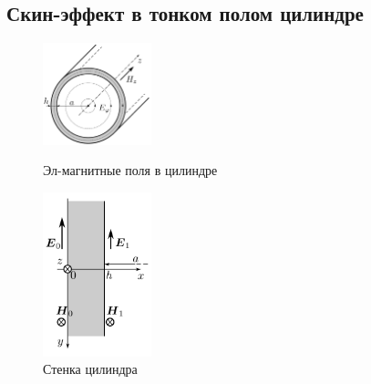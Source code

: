 \documentclass{article}
\begin{document}

\subsection{Скин-эффект в тонком полом цилиндре}
\vspace{1cm}
\begin{figure}
  \begin{center}
    \includegraphics[width=0.28\textwidth]{cilindr}
  \end{center}
  \caption{Эл-магнитные поля в цилиндре}\label{fig:cilindr}

  \begin{center}
    \includegraphics[width=0.28\textwidth]{stenka}
  \end{center}
  \caption{Стенка цилиндра}\label{fig:stenka}
\end{figure}
\end{document}

